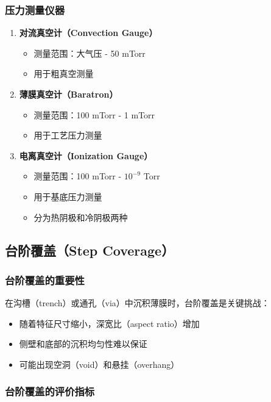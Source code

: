 \documentclass[UTF8,12pt,a4paper]{ctexart}
\begin{document}
\subsubsection{压力测量仪器}

\begin{enumerate}
    \item \textbf{对流真空计（Convection Gauge）}
    \begin{itemize}
        \item 测量范围：大气压 - 50 mTorr
        \item 用于粗真空测量
    \end{itemize}
    
    \item \textbf{薄膜真空计（Baratron）}
    \begin{itemize}
        \item 测量范围：100 mTorr - 1 mTorr
        \item 用于工艺压力测量
    \end{itemize}
    
    \item \textbf{电离真空计（Ionization Gauge）}
    \begin{itemize}
        \item 测量范围：100 mTorr - $10^{-9}$ Torr
        \item 用于基底压力测量
        \item 分为热阴极和冷阴极两种
    \end{itemize}
\end{enumerate}

\subsection{台阶覆盖（Step Coverage）}

\subsubsection{台阶覆盖的重要性}

在沟槽（trench）或通孔（via）中沉积薄膜时，台阶覆盖是关键挑战：
\begin{itemize}
    \item 随着特征尺寸缩小，深宽比（aspect ratio）增加
    \item 侧壁和底部的沉积均匀性难以保证
    \item 可能出现空洞（void）和悬挂（overhang）
\end{itemize}

\subsubsection{台阶覆盖的评价指标}
\end{document}
